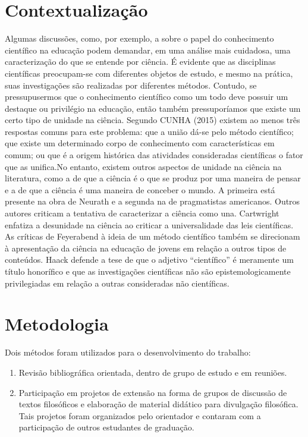 \documentclass[12pt]{report}
\begin{document}
		\section*{Contextualização}		
		Algumas discussões, como, por exemplo, a sobre o papel do conhecimento científico na educação podem demandar, em uma análise mais cuidadosa, uma caracterização do que se entende por ciência. É evidente que as disciplinas científicas preocupam-se com diferentes objetos de estudo, e mesmo na prática, suas investigações são realizadas por diferentes métodos. Contudo, se pressupusermos que o conhecimento científico como um todo deve possuir um destaque ou privilégio na educação, então também pressuporíamos que existe um certo tipo de unidade na ciência. Segundo CUNHA (2015)  existem ao menos três respostas comuns para este problema: que a união dá-se pelo método científico; que existe um determinado corpo de conhecimento com características em comum; ou que é a origem histórica das atividades consideradas científicas o fator que as unifica.No entanto, existem outros aspectos de unidade na ciência na literatura, como a de que a ciência é o que se produz por uma maneira de pensar e a de que a ciência é uma maneira de conceber o mundo. A primeira está presente na obra de Neurath e a segunda na de pragmatistas americanos. Outros autores criticam a tentativa de caracterizar a ciência como una. Cartwright enfatiza a desunidade na ciência ao criticar a universalidade das leis científicas. As críticas de Feyerabend à ideia de um método científico também se direcionam à apresentação da ciência na educação de jovens em relação a outros tipos de conteúdos. Haack defende a tese de que o adjetivo “científico” é meramente um título honorífico e que as investigações científicas não são epistemologicamente privilegiadas em relação a outras consideradas não científicas. 
	
		\section*{Metodologia}
		
		Dois métodos foram utilizados para o desenvolvimento do trabalho:
		
		\begin{enumerate}
			\item Revisão bibliográfica orientada, dentro de grupo de estudo e em reuniões.
			\item Participação em projetos de extensão na forma de grupos de discussão de textos filosóficos e elaboração de material didático para divulgação filosófica. Tais projetos foram organizados pelo orientador e contaram com a participação de outros
			estudantes de graduação. 
		\end{enumerate}
\end{document}
